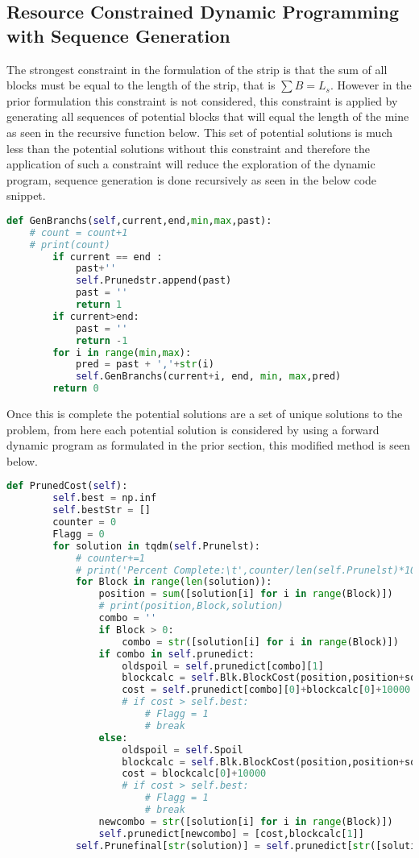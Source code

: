 \subsection{Resource Constrained Dynamic Programming with Sequence Generation}
The strongest constraint in the formulation of the strip is that the sum of all blocks must be equal to the length of the strip, that is $\sum B = L_s$. However in the prior formulation this constraint is not considered, this constraint is applied by generating all sequences of potential blocks that will equal the length of the mine as seen in the recursive function below. This set of potential solutions is much less than the potential solutions without this constraint and therefore the application of such a constraint will reduce the exploration of the dynamic program, sequence generation is done recursively as seen in the below code snippet. 
\begin{lstlisting}[language = python]
def GenBranchs(self,current,end,min,max,past):
	# count = count+1
	# print(count)
		if current == end :
			past+''
			self.Prunedstr.append(past)
			past = ''
			return 1
		if current>end:
			past = ''
			return -1
		for i in range(min,max):
			pred = past + ','+str(i)
			self.GenBranchs(current+i, end, min, max,pred)
		return 0
\end{lstlisting}
Once this is complete the potential solutions are a set of unique solutions to the problem, from here each potential solution is considered by using a forward dynamic program as formulated in the prior section, this modified method is seen below. 
\begin{lstlisting}[language = python]
def PrunedCost(self):
		self.best = np.inf
		self.bestStr = []
		counter = 0
		Flagg = 0
		for solution in tqdm(self.Prunelst):
			# counter+=1
			# print('Percent Complete:\t',counter/len(self.Prunelst)*100,'%')
			for Block in range(len(solution)):
				position = sum([solution[i] for i in range(Block)])
				# print(position,Block,solution)
				combo = ''
				if Block > 0:
					combo = str([solution[i] for i in range(Block)])
				if combo in self.prunedict:
					oldspoil = self.prunedict[combo][1]
					blockcalc = self.Blk.BlockCost(position,position+solution[Block],oldspoil)
					cost = self.prunedict[combo][0]+blockcalc[0]+10000
					# if cost > self.best:
						# Flagg = 1
						# break
				else:
					oldspoil = self.Spoil
					blockcalc = self.Blk.BlockCost(position,position+solution[Block],oldspoil)
					cost = blockcalc[0]+10000
					# if cost > self.best:
						# Flagg = 1
						# break
				newcombo = str([solution[i] for i in range(Block)])
				self.prunedict[newcombo] = [cost,blockcalc[1]]
			self.Prunefinal[str(solution)] = self.prunedict[str([solution[i] for i in range(Block)])]

\end{lstlisting}
